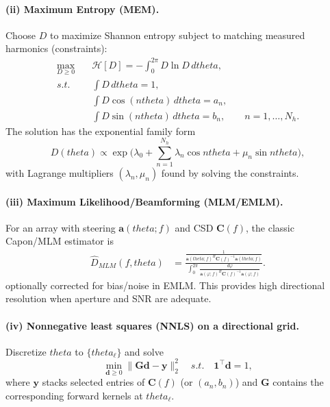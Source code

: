\documentclass[journal,10pt,twocolumn]{IEEEtran}
\def\theta{theta}%
\def\mathrm#1{#1}%
\def\text#1{#1}%
\def\;{ }%
\begin{document}
    \paragraph{(ii) Maximum Entropy (MEM).}
    Choose $D$ to maximize Shannon entropy subject to matching measured harmonics (constraints):
	\begin{equation}
	\begin{aligned}
	\max_{D\ge 0}\quad
	& \mathcal{H}[D]
	  = -\int_{0}^{2\pi} D \ln D \, d\theta,
	\\
	\text{s.t.}\quad
	& \int D\, d\theta = 1,
	\\
	& \int D \cos(n\theta)\, d\theta = a_n,
	\\
	& \int D \sin(n\theta)\, d\theta = b_n,
	\qquad n=1,\ldots,N_h.
	\end{aligned}
	\end{equation}
    The solution has the exponential family form
    \begin{equation}
        D(\theta)\propto
        \exp\Big(\lambda_0 + \sum_{n=1}^{N_h}\lambda_n\cos n\theta + \mu_n\sin n\theta\Big),
    \end{equation}
    with Lagrange multipliers $(\lambda_n,\mu_n)$ found by solving the constraints.

    \paragraph{(iii) Maximum Likelihood/Beamforming (MLM/EMLM).}
    For an array with steering $\mathbf{a}(\theta;f)$ and CSD $\mathbf{C}(f)$, the classic Capon/MLM estimator is
    \begin{equation}
    \begin{aligned}
    \widehat{D}_{\text{MLM}}(f,\theta)
    &=
    \frac{
      \displaystyle
      \frac{1}{
        \mathbf{a}(\theta;f)^{\mathrm{H}}
        \mathbf{C}(f)^{-1}
        \mathbf{a}(\theta;f)
      }
    }{
      \displaystyle
      \int_{0}^{2\pi}
      \frac{d\varphi}{
        \mathbf{a}(\varphi;f)^{\mathrm{H}}
        \mathbf{C}(f)^{-1}
        \mathbf{a}(\varphi;f)
      }
    }.
    \end{aligned}
    \end{equation}
    optionally corrected for bias/noise in EMLM. This provides high directional resolution when aperture and SNR are adequate.

    \paragraph{(iv) Nonnegative least squares (NNLS) on a directional grid.}
    Discretize $\theta$ to $\{\theta_\ell\}$ and solve
    \begin{equation}
        \min_{\mathbf{d}\ge0}\;\big\|\mathbf{G}\mathbf{d}-\mathbf{y}\big\|_2^2
        \quad \text{s.t.}\quad \mathbf{1}^\top\mathbf{d}=1,
    \end{equation}
    where $\mathbf{y}$ stacks selected entries of $\mathbf{C}(f)$ (or $(a_n,b_n)$) and $\mathbf{G}$ contains the corresponding forward kernels at $\theta_\ell$.
\end{document}
